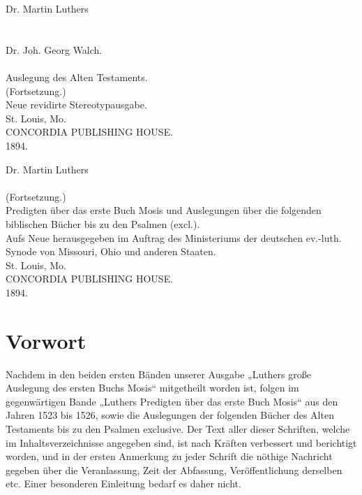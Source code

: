 \begin{titelseite}
Dr. Martin Luthers\\[1em]
\\[1em]
\\[0.5em]
Dr. Joh. Georg Walch.\\[1em]
\\[0.5em]
Auslegung des Alten Testaments.\\
(Fortsetzung.)\\[1em]
Neue revidirte Stereotypausgabe.\\[1em]
St. Louis, Mo.\\
CONCORDIA PUBLISHING HOUSE.\\
1894.
\end{titelseite}

\begin{titelseite}
Dr. Martin Luthers\\[1em]
\\[0.5em]
(Fortsetzung.)\\[1em]
Predigten über das erste Buch Mosis und Auslegungen über die folgenden
biblischen Bücher bis zu den Psalmen (excl.).\\[1em]
Aufs Neue herausgegeben im Auftrag des Ministeriums der deutschen
ev.-luth. Synode von Missouri, Ohio und anderen Staaten.\\[1em]
St. Louis, Mo.\\
CONCORDIA PUBLISHING HOUSE.\\
1894.
\end{titelseite}

\chapter{Vorwort}

Nachdem in den beiden ersten Bänden unserer Ausgabe „Luthers große Auslegung des ersten Buchs Mosis“ mitgetheilt worden ist, folgen im gegenwärtigen Bande „Luthers Predigten über das erste Buch Mosis“ aus den Jahren 1523 bis 1526, sowie die Auslegungen der folgenden Bücher des Alten Testaments bis zu den Psalmen exclusive. Der Text aller dieser Schriften, welche im Inhaltsverzeichnisse angegeben sind, ist nach Kräften verbessert und berichtigt worden, und in der ersten Anmerkung zu jeder Schrift die nöthige Nachricht gegeben über die Veranlassung, Zeit der Abfassung, Veröffentlichung derselben etc. Einer besonderen Einleitung bedarf es daher nicht.

